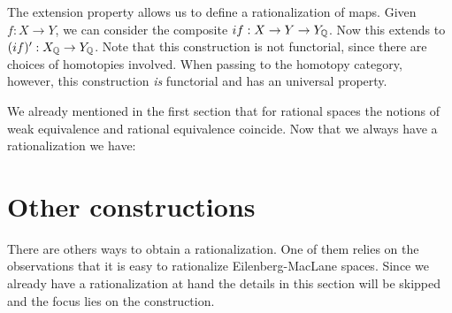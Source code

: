 

The extension property allows us to define a rationalization of maps. Given $f : X \to Y$, we can consider the composite $if : X \to Y \to Y_{\mathbb{Q}}$. Now this extends to $(if)' : X_{\mathbb{Q}} \to Y_{\mathbb{Q}}$. Note that this construction is not functorial, since there are choices of homotopies involved. When passing to the homotopy category, however, this construction \emph{is} functorial and has an universal property.

We already mentioned in the first section that for rational spaces the notions of weak equivalence and rational equivalence coincide. Now that we always have a rationalization we have:



\section{Other constructions}
There are others ways to obtain a rationalization. One of them relies on the observations that it is easy to rationalize Eilenberg-MacLane spaces. Since we already have a rationalization at hand the details in this section will be skipped and the focus lies on the construction.

